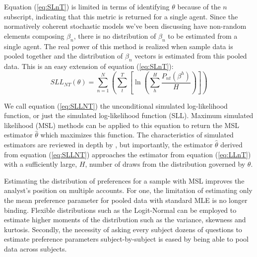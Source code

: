 \documentclass[../main.tex]{subfiles}
\begin{document}
Equation (\ref{eq:SLnT}) is limited in terms of identifying $\theta$ because of the $n$ subscript, indicating that this metric is returned for a single agent.
Since the normatively coherent stochastic models we've been discussing have non-random elements composing $\beta_n$, there is no distribution of $\beta_n$ to be estimated from a single agent.
The real power of this method is realized when sample data is pooled together and the distribution of $\beta_n$ vectors is estimated from this pooled data.
This is an easy extension of equation (\ref{eq:SLnT}):
\begin{equation}
	\label{eq:SLLNT}
	\mathit{SLL}_{NT}(\theta) = \sum_{n=1}^N \left( \sum_t^T \left[ \ln\!\left( \sum_h^H \frac{ P_{nt}(\beta^h) }{H} \right) \right] \right)
\end{equation}

We call equation (\ref{eq:SLLNT}) the unconditional simulated log-likelihood function, or just the simulated log-likelihood function (SLL).
Maximum simulated likelihood (MSL) methods can be applied to this equation to return the MSL estimator $\hat{\theta}$ which maximizes this function.
The characteristics of simulated estimators are reviewed in depth by \textcite[Chapter~10]{Train2002}, but importantly, the estimator $\hat{\theta}$ derived from equation (\ref{eq:SLLNT}) approaches the estimator from equation (\ref{eq:LLnT}) with a sufficiently large, $H$, number of draws from the distribution governed by $\theta$.

Estimating the distribution of preferences for a sample with MSL improves the analyst's position on multiple accounts.
For one, the limitation of estimating only the mean preference parameter for pooled data with standard MLE is no longer binding.
Flexible distributions such as the Logit-Normal{\footnotemark} can be employed to estimate higher moments of the distribution such as the variance, skewness and kurtosis.
Secondly, the necessity of asking every subject dozens of questions to estimate preference parameters subject-by-subject is eased by being able to pool data across subjects.

\addtocounter{footnote}{-1}
\end{document}
